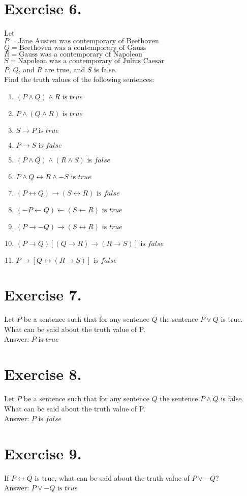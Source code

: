 \documentclass{article}
\begin{document}
\section*{Exercise 6.}
Let\\
$P = \text{Jane Austen was contemporary of Beethoven}$\\
$Q = \text{Beethoven was a contemporary of Gauss}$\\
$R = \text{Gauss was a contemporary of Napoleon}$\\
$S = \text{Napoleon was a contemporary of Julius Caesar}$\\
$P$, $Q$, and $R$ are true, and $S$ is false.\\
Find the truth values of the following sentences:
\medskip
\begin{enumerate}[label=(\alph*)]
\item $(P \wedge Q) \wedge R \text{ is } true$
\item $P \wedge (Q \wedge R) \text{ is } true$
\item $S \rightarrow P \text{ is } true$
\item $P \rightarrow S \text{ is } false$
\item $(P \wedge Q) \wedge (R \wedge S) \text{ is } false$
\item $P \wedge Q \leftrightarrow R \wedge -S \text{ is } true$
\item $(P \leftrightarrow Q) \rightarrow (S \leftrightarrow R) \text{ is } false$
\item $(-P \leftarrow Q) \leftarrow (S \leftarrow R) \text{ is } true$
\item $(P \rightarrow -Q) \rightarrow (S \leftrightarrow R) \text{ is } true$
\item $(P \rightarrow Q) [(Q \rightarrow R) \rightarrow (R \rightarrow S)] \text{ is } false$
\item $P \rightarrow [Q \leftrightarrow (R \rightarrow S)] \text{ is } false$
\end{enumerate}

\section*{Exercise 7.}
Let $P$ be a sentence such that for any sentence $Q$ the sentence $P \vee Q$ is true.\\
What can be said about the truth value of P.\\
Answer: $P \text{ is } true$

\section*{Exercise 8.}
Let $P$ be a sentence such that for any sentence $Q$ the sentence $P \wedge Q$ is false.\\
What can be said about the truth value of P.\\
Answer: $P \text{ is } false$

\section*{Exercise 9.} 
If $P \leftrightarrow Q$ is true, what can be said about the truth value of $P \vee -Q$?\\
Answer: $P \vee -Q \text{ is } true$
\end{document}

